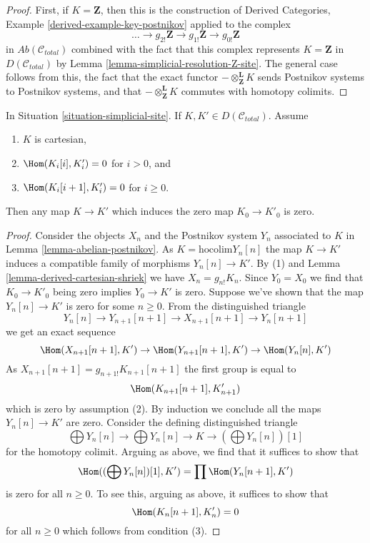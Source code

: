 \begin{proof}
First, if $K = \mathbf{Z}$, then this is the construction of
Derived Categories, Example \ref{derived-example-key-postnikov}
applied to the complex
$$
\ldots \to
g_{2!}\mathbf{Z} \to
g_{1!}\mathbf{Z} \to
g_{0!}\mathbf{Z}
$$
in $\textit{Ab}(\mathcal{C}_{total})$ combined with the fact that
this complex represents $K = \mathbf{Z}$ in $D(\mathcal{C}_{total})$
by Lemma \ref{lemma-simplicial-resolution-Z-site}.
The general case follows from this, the fact that the exact functor
$- \otimes^\mathbf{L}_\mathbf{Z} K$ sends Postnikov systems to
Postnikov systems, and
that $- \otimes^\mathbf{L}_\mathbf{Z} K$ commutes with homotopy colimits.
\end{proof}

\begin{lemma}
\label{lemma-nullity-cartesian-objects-derived}
In Situation \ref{situation-simplicial-site}.
If $K, K' \in D(\mathcal{C}_{total})$.
Assume
\begin{enumerate}
\item $K$ is cartesian,
\item $\Hom(K_i[i], K'_i) = 0$ for $i > 0$, and
\item $\Hom(K_i[i + 1], K'_i) = 0$ for $i \geq 0$.
\end{enumerate}
Then any map $K \to K'$ which induces the zero map $K_0 \to K'_0$ is zero.
\end{lemma}

\begin{proof}
Consider the objects $X_n$ and the Postnikov system $Y_n$
associated to $K$ in Lemma \ref{lemma-abelian-postnikov}.
As $K = \text{hocolim} Y_n[n]$ the map $K \to K'$ induces
a compatible family of morphisms $Y_n[n] \to K'$.
By (1) and Lemma \ref{lemma-derived-cartesian-shriek} we have
$X_n = g_{n!}K_n$. Since $Y_0 = X_0$ we find that
$K_0 \to K'_0$ being zero implies $Y_0 \to K'$ is zero.
Suppose we've shown that the map $Y_n[n] \to K'$ is zero
for some $n \geq 0$. From the distinguished triangle
$$
Y_n[n] \to Y_{n + 1}[n + 1] \to X_{n + 1}[n + 1] \to Y_n[n + 1]
$$
we get an exact sequence
$$
\Hom(X_{n + 1}[n + 1], K') \to
\Hom(Y_{n + 1}[n + 1], K') \to
\Hom(Y_n[n], K')
$$
As $X_{n + 1}[n + 1] = g_{n + 1!}K_{n + 1}[n + 1]$ the first group is equal to
$$
\Hom(K_{n + 1}[n + 1], K'_{n + 1})
$$
which is zero by assumption (2). By induction we conclude all the maps
$Y_n[n] \to K'$ are zero. Consider the defining distinguished triangle
$$
\bigoplus Y_n[n] \to
\bigoplus Y_n[n] \to
K \to
(\bigoplus Y_n[n])[1]
$$
for the homotopy colimit. Arguing as above, we find that it suffices
to show that
$$
\Hom((\bigoplus Y_n[n])[1], K') = \prod \Hom(Y_n[n + 1], K')
$$
is zero for all $n \geq 0$. To see this, arguing as above,
it suffices to show that
$$
\Hom(K_n[n + 1], K'_n)  = 0
$$
for all $n \geq 0$ which follows from condition (3).
\end{proof}

